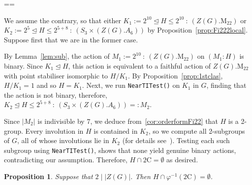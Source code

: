 \documentclass[11pt, a4paper]{amsart}
\makeatletter
\def\cn{\mathord{{\!\:{:}\:\!}}}
\newtheorem{prop}[thm]{Proposition}
\renewcommand{\proofname}{Proof}
\renewenvironment{proof}[1][\proofname]{\par
  \pushQED{\qed}  \normalfont \partopsep=\z@skip \topsep=\z@skip
  \trivlist
  \item[\hskip\labelsep
        \scshape
    #1\@addpunct{.}]\ignorespaces
}{  \popQED\endtrivlist\@endpefalse
}
\makeatother
\begin{document}
\begin{proof}
    We assume the contrary, so that either $K_1:=2^{10}\trianglelefteq H\leq 2^{10}\cn(Z(G).\mathrm{M}_{22})$ or $K_2:=2^{5}\trianglelefteq H\leq 2^{5+8}\cn( S_3\times (Z(G). A_6))$ by Proposition~\ref{prop:Fi222local}. Suppose first that we are in the former case.

    By Lemma~\ref{lem:sub}, the action of $M_1:=2^{10}\cn(Z(G).\mathrm{M}_{22})$ on $(M_1:H)$ is binary. Since $K_1\trianglelefteq H$, this action is equivalent to a faithful action of $Z(G).\mathrm{M}_{22}$ with point stabiliser isomorphic to $H/K_1$. By Proposition~\ref{prop:1stclas}, $H/K_1=1$ and so $H=K_1$. Next, we run {\tt{NearTITest()}} on $K_1$ in $G$, finding that the action is not binary, therefore, $K_2\trianglelefteq H\leq2^{5+8}\cn( S_3\times  (Z(G).A_6))=:M_2$.

    Since $|M_2|$ is indivisible by $7$, we deduce from~\ref{cor:orderformFi22} that $H$ is a 2-group. Every involution in $H$ is contained in $K_2$, so we compute all 2-subgroups of $G$, all of whose involutions lie in $K_2$ (for details see~\cite{comps}). Testing each such subgroup using {\tt NearTITest()}, shows that none yield genuine binary actions, contradicting our assumption. Therefore, $H\cap \mathrm{2C}=\emptyset$ as desired.\end{proof}
\begin{prop}\label{prop:2fi22no2C}
    Suppose that $2\mid |Z(G)|$. Then $H\cap \varphi^{-1}(\mathrm{2C})=\emptyset$.  
\end{prop}
\end{document}
